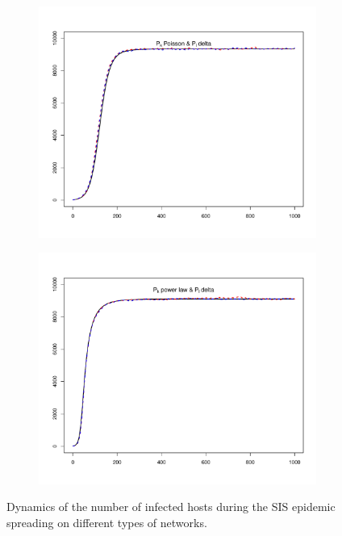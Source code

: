 \begin{figure}[hbtp]
\begin{subfigure}[b]{0.45\textwidth}
    \end{subfigure}
    \newline
    \begin{subfigure}[b]{0.45\textwidth}
        \centering
        \includegraphics[width=\textwidth, trim=30 20 30 20, clip]{../img/sis_02.pdf}
    \end{subfigure}
    \hspace{0.08\textwidth}
    \begin{subfigure}[b]{0.45\textwidth}
        \centering
        \includegraphics[width=\textwidth, trim=30 20 30 20, clip]{../img/sis_12.pdf}
    \end{subfigure}
    \newline
    \caption{Dynamics of the number of infected hosts during the SIS epidemic spreading on different types of networks.}
\end{figure}